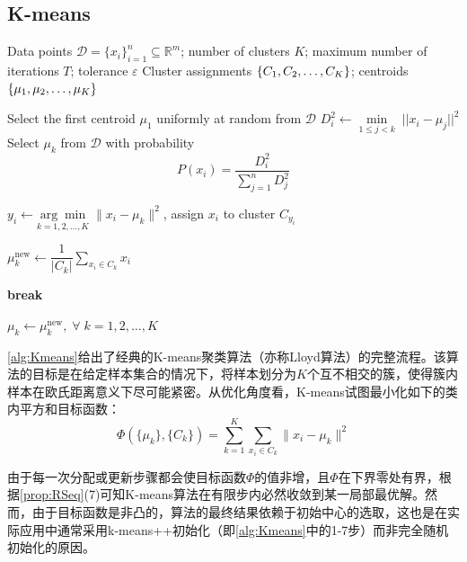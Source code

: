 \subsection{K-means}
\begin{algorithm}[H]
	\caption{K-means Clustering (Lloyd's Algorithm)}
	\label{alg:Kmeans}
	\begin{algorithmic}[1]
		\Require Data points $\mathcal{D}=\{x_i\}_{i=1}^{n}\subseteq\mathbb{R}^m$;
		number of clusters $K$;
		maximum number of iterations $T$;
		tolerance $\varepsilon$
		\Ensure Cluster assignments $\{C_1, C_2, \dots, C_{K}\}$;
		centroids $\{\mu_1, \mu_2, \dots, \mu_{K}\}$
		
		\State Select the first centroid $\mu_1$ uniformly at random from $\mathcal{D}$ 
		\State $D_i^2 \gets \min\limits_{1\leqslant j < k}\;||x_i - \mu_j||^2$
		\EndFor
		\State Select $\mu_k$ from $\mathcal{D}$ with probability
		\[
		P(x_i) = \frac{D_i^2}{\sum\limits_{j=1}^n D_j^2}
		\]
		\EndFor
		
		 
		\State $y_i \gets \underset{k=1,2,\dots,K}{\arg\min}\;\|x_i-\mu_k\|^2$, assign $x_i$ to cluster $C_{y_i}$
		\EndFor
		
		 
		\State $\mu_k^{\text{new}} \gets \dfrac{1}{|C_k|}
		\sum\limits_{x_i\in C_k} x_i$
		\EndFor
		
		\State \textbf{break}
		\EndIf
		
		\State $\mu_k \gets \mu_k^{\text{new}},\;\forall\;k=1,2,\dots,K$
		\EndFor
	\end{algorithmic}
\end{algorithm}
\cref{alg:Kmeans}给出了经典的K-means聚类算法（亦称Lloyd算法）的完整流程。该算法的目标是在给定样本集合的情况下，将样本划分为$K$个互不相交的簇，使得簇内样本在欧氏距离意义下尽可能紧密。从优化角度看，K-means试图最小化如下的类内平方和目标函数：
\begin{equation*}
	\Phi(\{\mu_k\},\{C_k\})=\sum_{k=1}^K\sum_{x_i\in C_k}\|x_i-\mu_k\|^2
\end{equation*}\par
由于每一次分配或更新步骤都会使目标函数$\Phi$的值非增，且$\Phi$在下界零处有界，根据\cref{prop:RSeq}(7)可知K-means算法在有限步内必然收敛到某一局部最优解。然而，由于目标函数是非凸的，算法的最终结果依赖于初始中心的选取，这也是在实际应用中通常采用k-means++初始化（即\cref{alg:Kmeans}中的1-7步）而非完全随机初始化的原因。
